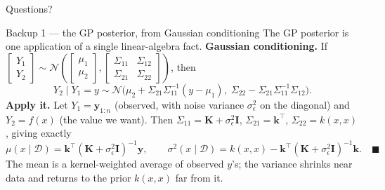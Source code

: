 \documentclass[10pt, aspectratio=169]{beamer}
\begin{document}
\begin{frame}[standout]
Questions?
\end{frame}

\appendix

\begin{frame}{Backup 1 --- the GP posterior, from Gaussian conditioning}
\footnotesize
The GP posterior is one application of a single linear-algebra fact.
\medskip
\textbf{Gaussian conditioning.} If $\begin{bmatrix}Y_1\\Y_2\end{bmatrix}\sim\mathcal{N}\!\left(\begin{bmatrix}\mu_1\\\mu_2\end{bmatrix},\begin{bmatrix}\Sigma_{11}&\Sigma_{12}\\\Sigma_{21}&\Sigma_{22}\end{bmatrix}\right)$, then
\[
Y_2\mid Y_1 = y \sim \mathcal{N}\big(\mu_2 + \Sigma_{21}\Sigma_{11}^{-1}(y-\mu_1),\; \Sigma_{22}-\Sigma_{21}\Sigma_{11}^{-1}\Sigma_{12}\big).
\]
\textbf{Apply it.} Let $Y_1 = \mathbf{y}_{1:n}$ (observed, with noise variance $\sigma_\epsilon^2$ on the diagonal) and $Y_2 = f(x)$ (the value we want). Then $\Sigma_{11} = \mathbf{K}+\sigma_\epsilon^2\mathbf{I}$, $\Sigma_{21}=\mathbf{k}^\top$, $\Sigma_{22}=k(x,x)$, giving exactly
\[
\mu(x\mid\mathcal{D}) = \mathbf{k}^\top(\mathbf{K}+\sigma_\epsilon^2\mathbf{I})^{-1}\mathbf{y}, \qquad \sigma^2(x\mid\mathcal{D}) = k(x,x)-\mathbf{k}^\top(\mathbf{K}+\sigma_\epsilon^2\mathbf{I})^{-1}\mathbf{k}. \quad\blacksquare
\]
The mean is a kernel-weighted average of observed $y$'s; the variance shrinks near data and returns to the prior $k(x,x)$ far from it.
\end{frame}
\end{document}
